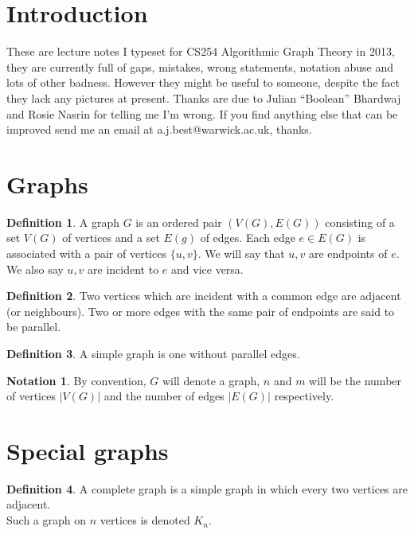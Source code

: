 \documentclass{article}
\theoremstyle{definition}
\newtheorem*{defn}{Definition}
\newtheorem*{nota}{Notation}
\begin{document}
\maketitle
\tableofcontents
\section*{Introduction}
These are lecture notes I typeset for CS254 Algorithmic Graph Theory in 2013, they are currently full of gaps, mistakes, wrong statements, notation abuse and lots of other badness.
However they might be useful to someone, despite the fact they lack any pictures at present.
Thanks are due to Julian ``Boolean'' Bhardwaj and Rosie Nasrin for telling me I'm wrong.
If you find anything else that can be improved send me an email at a.j.best@warwick.ac.uk, thanks.
\clearpage

\section{Graphs}
\begin{defn}
A graph $G$ is an ordered pair $(V(G),E(G))$ consisting of a set $V(G)$ of vertices and a set $E(g)$ of edges.
Each edge $e\in E(G)$ is associated with a pair of vertices $\{u,v\}$.
We will say that $u,v$ are endpoints of $e$.
We also say $u,v$ are incident to $e$ and vice versa.
\end{defn}

\begin{defn}
Two vertices which are incident with a common edge are adjacent (or neighbours).
Two or more edges with the same pair of endpoints are said to be parallel.
\end{defn}

\begin{defn}
A simple graph is one without parallel edges.
\end{defn}

\begin{nota}
By convention, $G$ will denote a graph, $n$ and $m$ will be the number of vertices $|V(G)|$ and the number of edges $|E(G)|$ respectively.
\end{nota}

\section{Special graphs}
\begin{defn}
A complete graph is a simple graph in which every two vertices are adjacent. \\
Such a graph on $n$ vertices is denoted $K_n$.
\end{defn}
\begin{center}
\end{center}
\end{document}
